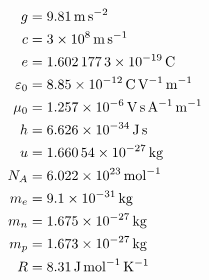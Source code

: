 
\begin{align}
\label{eq:konstanten:fallbeschleunigung}
g &= \SI{9.81}{\meter\per\second\squared}\\
\label{eq:konstanten:lichtgeschwindigkeit}
c &= \SI{3d8}{\meter\per\second}\\
\label{eq:konstanten:elementarladung}
e &= \SI{1.6021773d-19}{\coulomb}\\
\label{eq:konstanten:elektrische:feldkonstante}
\varepsilon_0 &= \SI{8.85d-12}{\coulomb\per\volt\per\meter}\\
\label{eq:konstanten:magnetische:feldkonstante}
\mu_0 &= \SI{1.257d-6}{\volt\second\per\ampere\per\meter}\\
\label{eq:konstanten:planck:konstante}
h &= \SI{6.626d-34}{\joule\second}\\
\label{eq:konstanten:atomare:masseneinheit}
u &= \SI{1.66054d-27}{\kilogram}\\
\label{eq:konstanten:avogadro:konstante}
N_A &= \SI{6.022d23}{\per\mol}\\
\label{eq:konstanten:masse:elektron}
m_e &= \SI{9.1d-31}{\kilogram}\\
\label{eq:konstanten:masse:neutron}
m_n &= \SI{1.675d-27}{\kilogram}\\
\label{eq:konstanten:masse:proton}
m_p &= \SI{1.673d-27}{\kilogram}\\
\label{eq:konstanten:allgemeine:gaskonstante}
R &= \SI{8.31}{\joule\per\mol\per\kelvin}
\end{align}